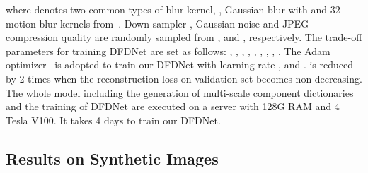 \documentclass[runningheads]{llncs}
\begin{document}
where  denotes two common types of blur kernel, \ie, Gaussian blur with  and 32 motion blur kernels from~\cite{levin2009understanding,boracchi2012modeling}. Down-sampler , Gaussian noise  and JPEG compression quality  are randomly sampled from ,  and , respectively.
The trade-off parameters for training DFDNet are set as follows: , , , , , , , , .
The Adam optimizer~\cite{kingma2014adam} is adopted to train our DFDNet with learning rate ,  and .  is reduced by 2 times when the reconstruction loss on validation set becomes non-decreasing. 
The whole model including the generation of multi-scale component dictionaries and the training of DFDNet are executed on a server with 128G RAM and 4 Tesla V100. It takes 4 days to train our DFDNet.


\subsection{Results on Synthetic Images}
\end{document}
